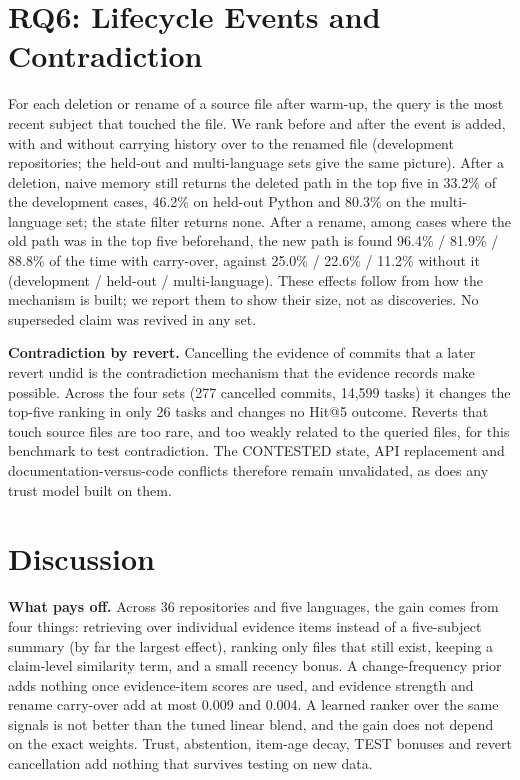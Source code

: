 \documentclass[runningheads]{llncs}
\begin{document}
\section{RQ6: Lifecycle Events and Contradiction}
\label{sec:life}
For each deletion or rename of a source file after warm-up, the query is the most recent subject that touched the file. We rank before and after the event is added, with and without carrying history over to the renamed file (development repositories; the held-out and multi-language sets give the same picture). After a deletion, naive memory still returns the deleted path in the top five in 33.2\% of the development cases, 46.2\% on held-out Python and 80.3\% on the multi-language set; the state filter returns none. After a rename, among cases where the old path was in the top five beforehand, the new path is found 96.4\% / 81.9\% / 88.8\% of the time with carry-over, against 25.0\% / 22.6\% / 11.2\% without it (development / held-out / multi-language). These effects follow from how the mechanism is built; we report them to show their size, not as discoveries. No superseded claim was revived in any set.

\textbf{Contradiction by revert.} Cancelling the evidence of commits that a later revert undid is the contradiction mechanism that the evidence records make possible. Across the four sets (277 cancelled commits, 14{,}599 tasks) it changes the top-five ranking in only 26 tasks and changes no Hit@5 outcome. Reverts that touch source files are too rare, and too weakly related to the queried files, for this benchmark to test contradiction. The CONTESTED state, API replacement and documentation-versus-code conflicts therefore remain unvalidated, as does any trust model built on them.

\section{Discussion}
\textbf{What pays off.} Across 36 repositories and five languages, the gain comes from four things: retrieving over individual evidence items instead of a five-subject summary (by far the largest effect), ranking only files that still exist, keeping a claim-level similarity term, and a small recency bonus. A change-frequency prior adds nothing once evidence-item scores are used, and evidence strength and rename carry-over add at most 0.009 and 0.004. A learned ranker over the same signals is not better than the tuned linear blend, and the gain does not depend on the exact weights. Trust, abstention, item-age decay, TEST bonuses and revert cancellation add nothing that survives testing on new data.
\end{document}

